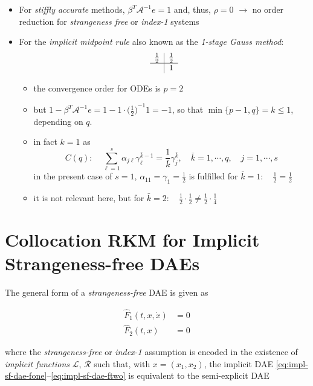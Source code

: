 \documentclass[]{book}
\providecommand{\tightlist}{%
  \setlength{\itemsep}{0pt}\setlength{\parskip}{0pt}}
\theoremstyle{definition}
\theoremstyle{definition}
\theoremstyle{definition}
\theoremstyle{remark}
\begin{document}
\begin{itemize}
\item
  For \emph{stiffly accurate} methods, \(\beta^T \mathcal A^{-1}e=1\)
  and, thus, \(\rho=0\) \(\rightarrow\) no order reduction for
  \emph{strangeness free} or \emph{index-1} systems
\item
  For the \emph{implicit midpoint rule} also known as the \emph{1-stage
  Gauss method}: \[
  \begin{array}{c|c}
  \frac 12 & \frac 12 \\
  \hline
   & 1  
  \end{array}
     \]

  \begin{itemize}
  \tightlist
  \item
    the convergence order for ODEs is \(p=2\)
  \item
    but
    \(1-\beta^T \mathcal A^{-1}e = 1- 1\cdot {\bigl(\frac 12\bigr)}^{-1} 1 = -1\),
    so that \(\min\{p-1, q\} = k \leq 1\), depending on \(q\).
  \item
    in fact \(k=1\) as \[
      C(q): \quad \sum_{\ell=1}^s\alpha_{j\ell}\gamma_\ell^{\bar k-1}=\frac{1}{\bar k} \gamma_j^{\bar k}, \quad {\bar k}=1,\cdots,q, \quad j=1,\cdots,s
      \] in the present case of \(s=1\),
    \(\alpha_{11}=\gamma_1=\frac 12\) is fulfilled for
    \({\bar k}=1: \quad \frac 12 = \frac 12\)
  \item
    it is not relevant here, but for
    \({\bar k}=2:\quad \frac 12 \cdot \frac 12 \neq \frac 12 \cdot \frac 14\)
  \end{itemize}
\end{itemize}

\section{Collocation RKM for Implicit Strangeness-free
DAEs}\label{collocation-rkm-for-implicit-strangeness-free-daes}

The general form of a \emph{strangeness-free} DAE is given as

\begin{align}
\hat F_1(t,x,\dot x) &= 0 \label{eq:impl-sf-dae-fone}\\
\hat F_2(t,x) &= 0 \label{eq:impl-sf-dae-ftwo}
\end{align}

where the \emph{strangeness-free} or \emph{index-1} assumption is
encoded in the existence of \emph{implicit functions} \(\mathcal L\),
\(\mathcal R\) such that, with \(x=(x_1,x_2)\), the implicit DAE
\eqref{eq:impl-sf-dae-fone}--\eqref{eq:impl-sf-dae-ftwo} is equivalent to
the semi-explicit DAE
\end{document}
